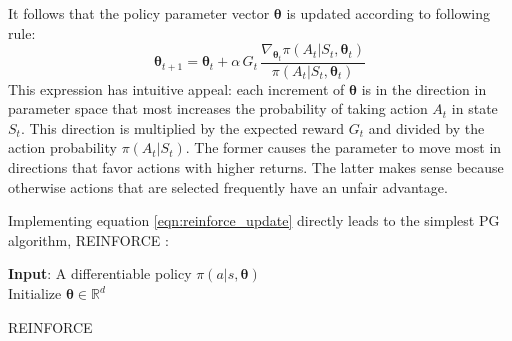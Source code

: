 It follows that the policy parameter vector $\bm{\theta}$ is updated according to following rule:
\begin{equation}
    \bm{\theta}_{t+1} = \bm{\theta}_t + \alpha \, G_t \, \frac{\nabla_{\bm{\theta}_t} \pi(A_t|S_t, \bm{\theta}_t)}{\pi(A_t|S_t, \bm{\theta}_t)}
    \label{eqn:reinforce_update}
\end{equation}
This expression has intuitive appeal: each increment of $\bm{\theta}$ is in the direction in parameter space that most increases the probability of taking action $A_t$ in state $S_t$. This direction is multiplied by the expected reward $G_t$ and divided by the action probability $\pi(A_t|S_t)$. The former causes the parameter to move most in directions that favor actions with higher returns. The latter makes sense because otherwise actions that are selected frequently have an unfair advantage.


Implementing equation \ref{eqn:reinforce_update} directly leads to the simplest PG algorithm, REINFORCE \cite{williams1992reinforce}:

\begin{algorithm}[H]
\SetAlgoLined
\textbf{Input}: A differentiable policy $\pi(a|s, \bm{\theta})$\\
Initialize $\bm{\theta} \in \mathbb{R}^d$\\
 \caption{REINFORCE}
 \label{algo:reinforce}
\end{algorithm}

